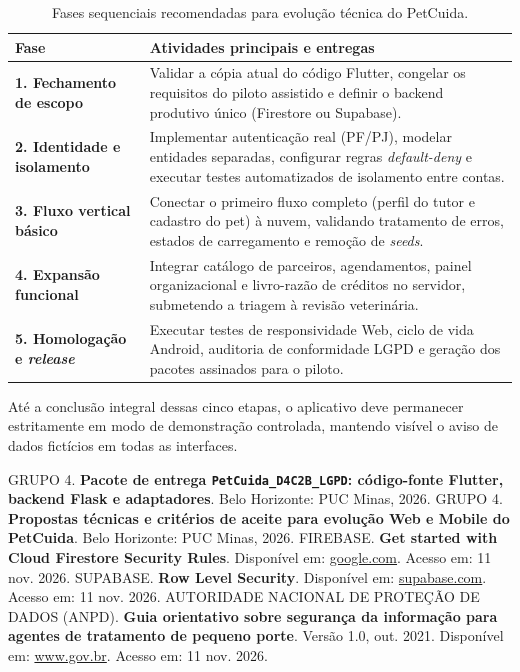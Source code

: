 \documentclass[12pt,a4paper]{article}
\begin{document}
\begin{table}[H]
\centering
\caption{Fases sequenciais recomendadas para evolução técnica do PetCuida.}
\label{tab:roteiro_execucao}
\begin{tabularx}{\textwidth}{>{\raggedright\arraybackslash}p{4.3cm}Y}
\toprule
\textbf{Fase} & \textbf{Atividades principais e entregas}\\
\midrule
\textbf{1. Fechamento de escopo} & Validar a cópia atual do código Flutter, congelar os requisitos do piloto assistido e definir o backend produtivo único (Firestore ou Supabase).\\
\addlinespace[5pt]
\textbf{2. Identidade e isolamento} & Implementar autenticação real (PF/PJ), modelar entidades separadas, configurar regras \textit{default-deny} e executar testes automatizados de isolamento entre contas.\\
\addlinespace[5pt]
\textbf{3. Fluxo vertical básico} & Conectar o primeiro fluxo completo (perfil do tutor e cadastro do pet) à nuvem, validando tratamento de erros, estados de carregamento e remoção de \textit{seeds}.\\
\addlinespace[5pt]
\textbf{4. Expansão funcional} & Integrar catálogo de parceiros, agendamentos, painel organizacional e livro-razão de créditos no servidor, submetendo a triagem à revisão veterinária.\\
\addlinespace[5pt]
\textbf{5. Homologação e \textit{release}} & Executar testes de responsividade Web, ciclo de vida Android, auditoria de conformidade LGPD e geração dos pacotes assinados para o piloto.\\
\bottomrule
\end{tabularx}
\end{table}


Até a conclusão integral dessas cinco etapas, o aplicativo deve permanecer estritamente em modo de demonstração controlada, mantendo visível o aviso de dados fictícios em todas as interfaces.

\begin{thebibliography}{9}
GRUPO 4. \textbf{Pacote de entrega \texttt{PetCuida_D4C2B_LGPD}: código-fonte Flutter, backend Flask e adaptadores}. Belo Horizonte: PUC Minas, 2026.
GRUPO 4. \textbf{Propostas técnicas e critérios de aceite para evolução Web e Mobile do PetCuida}. Belo Horizonte: PUC Minas, 2026.
FIREBASE. \textbf{Get started with Cloud Firestore Security Rules}. Disponível em: \url{google.com}. Acesso em: 11 nov. 2026.
SUPABASE. \textbf{Row Level Security}. Disponível em: \url{supabase.com}. Acesso em: 11 nov. 2026.
AUTORIDADE NACIONAL DE PROTEÇÃO DE DADOS (ANPD). \textbf{Guia orientativo sobre segurança da informação para agentes de tratamento de pequeno porte}. Versão 1.0, out. 2021. Disponível em: \url{www.gov.br}. Acesso em: 11 nov. 2026.
\end{thebibliography}
\end{document}
